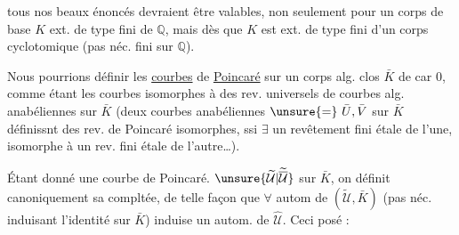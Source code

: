 tous nos beaux énoncés devraient être valables, non seulement pour un corps de base $K$ ext. de type fini de $\mathbb{Q}$, mais dès que $K$ est ext. de type fini d'un corps cyclotomique (pas néc. fini sur $\mathbb{Q}$).

Nous pourrions définir les \uline{courbes} de \uline{Poincaré} sur un corps alg. clos $\bar K$ de car $0$, comme étant les courbes isomorphes à des rev. universels de courbes alg. anabéliennes sur $\bar K$ (deux courbes anabéliennes $\unsure{=}\ \bar U,\bar V$ sur $\bar K$ définissnt des rev. de Poincaré isomorphes, ssi $\exists$ un revêtement fini étale de l'une, isomorphe à un rev. fini étale de l'autre\ldots).

Étant donné une courbe de Poincaré. $\unsure{\widetilde{\mathcal U}|\widetilde{\overline{\mathcal U}}}$ sur $\bar K$,  on définit canoniquement sa compltée, de telle façon que $\forall$ autom de $(\widetilde{\mathcal U},\bar K)$ (pas néc. induisant l'identité sur $\bar K$) induise un autom. de $\widehat{\mathcal U}$.
Ceci posé :
